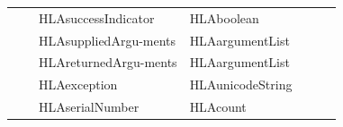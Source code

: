 \begin{landscape}
\begin{momtabletypeset}[8.00]
{{\begin{tabular}{|Y{116.92pt}|Y{137.54pt}|Y{76.22pt}|Y{103.88pt}|Y{65.90pt}|Y{66.32pt}|Y{38.52pt}|}
                    &                                    & HLAsuccessIndicator                     & HLAboolean                &                                         &             &         \\
                    &                                    & HLAsuppliedArgu-\newline ments          & HLAargumentList           &                                         &             &         \\
                    &                                    & HLAreturnedArgu-\newline ments          & HLAargumentList           &                                         &             &         \\
                    &                                    & HLAexception                            & HLAunicodeString          &                                         &             &         \\
                    &                                    & HLAserialNumber                         & HLAcount                  &                                         &             &         \\
                    \hline
                \end{tabular}%
            }%
        }%
    \end{momtabletypeset}
    \newpage


\end{landscape}
